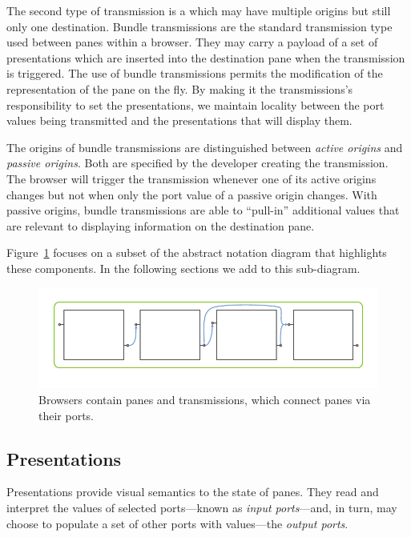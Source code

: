 \documentclass[a4paper,10pt,twoside]{book}
\begin{document}
The second type of transmission is a  which may have multiple origins but still only one destination. Bundle transmissions are the standard transmission type used between panes within a browser. They may carry a payload of a set of presentations which are inserted into the destination pane when the transmission is triggered. The use of bundle transmissions permits the modification of the representation of the pane on the fly. By making it the transmissions's responsibility to set the presentations, we maintain locality between the port values being transmitted and the presentations that will display them.

The origins of bundle transmissions are distinguished between
\emph{active origins} and \emph{passive origins}. Both are specified
by the developer creating the transmission. The browser will trigger
the transmission whenever one of its active origins changes but not
when only the port value of a passive origin changes. With passive
origins, bundle transmissions are able to ``pull-in'' additional values
that are relevant to displaying information on the destination pane.

Figure~\ref{fig:abs-browser} focuses on a subset of the abstract notation diagram that highlights these components. In the following sections we add to this sub-diagram.

\begin{figure}[htbp]
\centerline{\includegraphics[width=\linewidth]{browser.pdf}}
\caption{Browsers contain panes and transmissions, which connect panes via their ports.}
\label{fig:abs-browser}
\end{figure}



\subsection{Presentations}
\label{sec:impl/presentations}

Presentations provide visual semantics to the state of panes. They read and interpret the values of selected ports---known as \emph{input ports}---and, in turn, may choose to populate a set of other ports with values---the \emph{output ports}.
\end{document}
